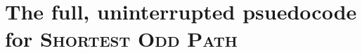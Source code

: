 \chapter{The full, uninterrupted psuedocode for \textsc{Shortest Odd Path}}
\label{appendix:full-psuedocode}

